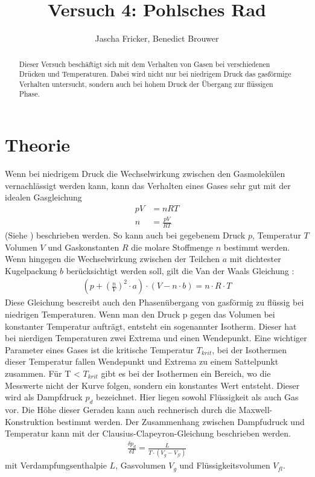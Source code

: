 \documentclass[11pt, a4paper]{article}
\title{Versuch 4: Pohlsches Rad}
\author{Jascha Fricker, Benedict Brouwer}
\begin{document}
    \maketitle

    

    \begin{abstract}
        Dieser Versuch beschäftigt sich mit dem Verhalten von Gasen bei verschiedenen Drücken und Temperaturen.
        Dabei wird nicht nur bei niedrigem Druck das gasförmige Verhalten untersucht, sondern auch bei hohem Druck
        der Übergang zur flüssigen Phase.
    \end{abstract}

    \tableofcontents

    \newpage

    \section{Theorie}
    Wenn bei niedrigem Druck die Wechselwirkung zwischen den Gasmolekülen vernachlässigt werden kann,
    kann das Verhalten eines Gases sehr gut mit der idealen Gasgleichung
    \begin{align}
        p V &= n R T \nonumber \nonumber\\
        n &= \frac{p V}{R T} \label{eq:ideal}
    \end{align}
    (Siehe \cite[(1)]{ZUS}) beschrieben werden. So kann auch bei gegebenem Druck $p$, Temperatur $T$ Volumen $V$ und
    Gaskonstanten $R$ die molare Stoffmenge $n$ bestimmt werden. \\

    Wenn hingegen die Wechselwirkung zwischen der Teilchen $a$ mit dichtester Kugelpackung $b$
    berücksichtigt werden soll, gilt die Van der Waals Gleichung \cite[(4)]{ZUS}:
    \begin{align}
        \left(p+\left(\frac{n}{V}\right)^2 \cdot a\right) \cdot \left(V-n \cdot b \right) = n \cdot R \cdot T
    \end{align}
    Diese Gleichung bescreibt auch den Phasenübergang von gasförmig zu flüssig bei niedrigen Temperaturen.
    Wenn man den Druck p gegen das Volumen bei konstanter Temperatur aufträgt, entsteht ein sogenannter Isotherm.
    Dieser hat bei nierdigen Temperaturen zwei Extrema und einen Wendepunkt. 
    Eine wichtiger Parameter eines Gases ist die kritische Temperatur $T_{krit}$, bei der Isothermen dieser Temperatur
    fallen Wendepunkt und Extrema zu einem Sattelpunkt zusammen. Für T < $T_{krit}$ gibt es bei der Isothermen ein Bereich,
    wo die Messwerte nicht der Kurve folgen, sondern ein konstantes Wert entsteht. Dieser wird als Dampfdruck $p_{d}$
    bezeichnet. Hier liegen sowohl Flüssigkeit als auch Gas vor. Die Höhe dieser Geraden kann auch rechnerisch durch die Maxwell-Konstruktion bestimmt werden.
    Der Zusammenhang zwischen Dampfudruck und Temperatur kann mit der Clausius-Clapeyron-Gleichung \cite[(9)]{ZUS} beschrieben werden.
    \begin{align}
        \frac{\delta p_d}{\delta T} = \frac{L}{T \cdot\left(V_g - V_{fl}\right)}
    \end{align}
    mit Verdampfungsenthalpie $L$, Gasvolumen $V_g$ und Flüssigkeitsvolumen $V_{fl}$.
\end{document}

